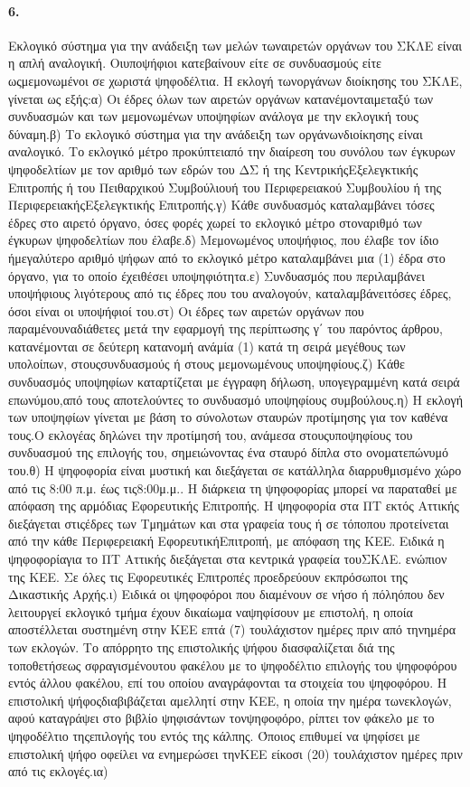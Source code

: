 \documentclass[a4paper,oneside, 10pt]{book}
\begin{document}
\paragraph { 6. } Εκλογικό σύστημα για την ανάδειξη των μελών τωναιρετών οργάνων του ΣΚΛΕ είναι η απλή αναλογική. Οιυποψήφιοι κατεβαίνουν είτε σε συνδυασμούς είτε ωςμεμονωμένοι σε χωριστά ψηφοδέλτια. Η εκλογή τωνοργάνων διοίκησης του ΣΚΛΕ, γίνεται ως εξής:α) Οι έδρες όλων των αιρετών οργάνων κατανέμονταιμεταξύ των συνδυασμών και των μεμονωμένων υποψηφίων ανάλογα με την εκλογική τους δύναμη.β) Το εκλογικό σύστημα για την ανάδειξη των οργάνωνδιοίκησης είναι αναλογικό. Το εκλογικό μέτρο προκύπτειαπό την διαίρεση του συνόλου των έγκυρων ψηφοδελτίων με τον αριθμό των εδρών του ΔΣ ή της ΚεντρικήςΕξελεγκτικής Επιτροπής ή του Πειθαρχικού Συμβούλιουή του Περιφερειακού Συμβουλίου ή της ΠεριφερειακήςΕξελεγκτικής Επιτροπής.γ) Κάθε συνδυασμός καταλαμβάνει τόσες έδρες στο αιρετό όργανο, όσες φορές χωρεί το εκλογικό μέτρο στοναριθμό των έγκυρων ψηφοδελτίων που έλαβε.δ) Μεμονωμένος υποψήφιος, που έλαβε τον ίδιο ήμεγαλύτερο αριθμό ψήφων από το εκλογικό μέτρο καταλαμβάνει μια (1) έδρα στο όργανο, για το οποίο έχειθέσει υποψηφιότητα.ε) Συνδυασμός που περιλαμβάνει υποψήφιους λιγότερους από τις έδρες που του αναλογούν, καταλαμβάνειτόσες έδρες, όσοι είναι οι υποψήφιοί του.στ) Οι έδρες των αιρετών οργάνων που παραμένουναδιάθετες μετά την εφαρμογή της περίπτωσης γ΄ του παρόντος άρθρου, κατανέμονται σε δεύτερη κατανομή ανάμία (1) κατά τη σειρά μεγέθους των υπολοίπων, στουςσυνδυασμούς ή στους μεμονωμένους υποψηφίους.ζ) Κάθε συνδυασμός υποψηφίων καταρτίζεται με έγγραφη δήλωση, υπογεγραμμένη κατά σειρά επωνύμου,από τους αποτελούντες το συνδυασμό υποψηφίους συμβούλους.η) Η εκλογή των υποψηφίων γίνεται με βάση το σύνολοτων σταυρών προτίμησης για τον καθένα τους.Ο εκλογέας δηλώνει την προτίμησή του, ανάμεσα στουςυποψηφίους του συνδυασμού της επιλογής του, σημειώνοντας ένα σταυρό δίπλα στο ονοματεπώνυμό του.θ) Η ψηφοφορία είναι μυστική και διεξάγεται σε κατάλληλα διαρρυθμισμένο χώρο από τις 8:00 π.μ. έως τις8:00μ.μ.. Η διάρκεια τη ψηφοφορίας μπορεί να παραταθεί με απόφαση της αρμόδιας Εφορευτικής Επιτροπής. Η ψηφοφορία στα ΠΤ εκτός Αττικής διεξάγεται στιςέδρες των Τμημάτων και στα γραφεία τους ή σε τόποπου προτείνεται από την κάθε Περιφερειακή ΕφορευτικήΕπιτροπή, με απόφαση της ΚΕΕ. Ειδικά η ψηφοφορίαγια το ΠΤ Αττικής διεξάγεται στα κεντρικά γραφεία τουΣΚΛΕ. ενώπιον της ΚΕΕ. Σε όλες τις Εφορευτικές Επιτροπές προεδρεύουν εκπρόσωποι της Δικαστικής Αρχής.ι) Ειδικά οι ψηφοφόροι που διαμένουν σε νήσο ή πόληόπου δεν λειτουργεί εκλογικό τμήμα έχουν δικαίωμα ναψηφίσουν με επιστολή, η οποία αποστέλλεται συστημένη στην ΚΕΕ επτά (7) τουλάχιστον ημέρες πριν από τηνημέρα των εκλογών. Το απόρρητο της επιστολικής ψήφου διασφαλίζεται διά της τοποθετήσεως σφραγισμένουτου φακέλου με το ψηφοδέλτιο επιλογής του ψηφοφόρου εντός άλλου φακέλου, επί του οποίου αναγράφονται τα στοιχεία του ψηφοφόρου. Η επιστολική ψήφοςδιαβιβάζεται αμελλητί στην ΚΕΕ, η οποία την ημέρα τωνεκλογών, αφού καταγράψει στο βιβλίο ψηφισάντων τονψηφοφόρο, ρίπτει τον φάκελο με το ψηφοδέλτιο τηςεπιλογής του εντός της κάλπης. Όποιος επιθυμεί να ψηφίσει με επιστολική ψήφο οφείλει να ενημερώσει τηνΚΕΕ είκοσι (20) τουλάχιστον ημέρες πριν από τις εκλογές.ια) 
\end{document}

